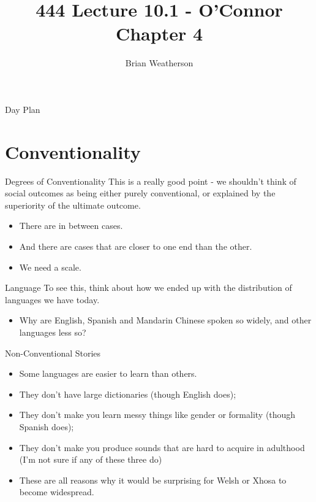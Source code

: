 \documentclass[
  ignorenonframetext,
]{beamer}
\title{444 Lecture 10.1 - O'Connor Chapter 4}
\author{Brian Weatherson}
\date{}
\providecommand{\tightlist}{%
  \setlength{\itemsep}{0pt}\setlength{\parskip}{0pt}}
\begin{document}
\frame{\titlepage}

\begin{frame}{Day Plan}
\protect\hypertarget{day-plan}{}
\tableofcontents
\end{frame}

\hypertarget{conventionality}{%
\section{Conventionality}\label{conventionality}}

\begin{frame}{Degrees of Conventionality}
\protect\hypertarget{degrees-of-conventionality}{}
This is a really good point - we shouldn't think of social outcomes as
being either purely conventional, or explained by the superiority of the
ultimate outcome.

\begin{itemize}
\tightlist
\item
  There are in between cases.
\item
  And there are cases that are closer to one end than the other.
\item
  We need a scale.
\end{itemize}
\end{frame}

\begin{frame}{Language}
\protect\hypertarget{language}{}
To see this, think about how we ended up with the distribution of
languages we have today.

\begin{itemize}
\tightlist
\item
  Why are English, Spanish and Mandarin Chinese spoken so widely, and
  other languages less so?
\end{itemize}
\end{frame}

\begin{frame}{Non-Conventional Stories}
\protect\hypertarget{non-conventional-stories}{}
\begin{itemize}
\tightlist
\item
  Some languages are easier to learn than others.
\item
  They don't have large dictionaries (though English does);
\item
  They don't make you learn messy things like gender or formality
  (though Spanish does);
\item
  They don't make you produce sounds that are hard to acquire in
  adulthood (I'm not sure if any of these three do)
\item
  These are all reasons why it would be surprising for Welsh or Xhosa to
  become widespread.
\end{itemize}
\end{frame}
\end{document}

